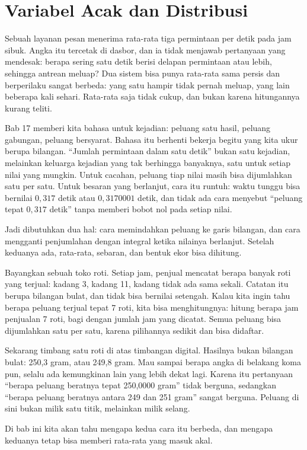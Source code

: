 \chapter{Variabel Acak dan Distribusi}

Sebuah layanan pesan menerima rata-rata tiga permintaan per detik pada jam sibuk.
Angka itu tercetak di dasbor, dan ia tidak menjawab pertanyaan yang mendesak: berapa
sering satu detik berisi delapan permintaan atau lebih, sehingga antrean meluap? Dua sistem bisa punya rata-rata sama persis dan berperilaku
sangat berbeda: yang satu hampir tidak pernah meluap, yang lain beberapa kali sehari.
Rata-rata saja tidak cukup, dan bukan karena hitungannya kurang teliti.

Bab 17 memberi kita bahasa untuk kejadian: peluang satu hasil, peluang gabungan,
peluang bersyarat. Bahasa itu berhenti bekerja begitu yang kita ukur berupa bilangan.
``Jumlah permintaan dalam satu detik'' bukan satu kejadian, melainkan keluarga
kejadian yang tak berhingga banyaknya, satu untuk setiap nilai yang mungkin. Untuk
cacahan, peluang tiap nilai masih bisa dijumlahkan satu per satu. Untuk besaran yang
berlanjut, cara itu runtuh: waktu tunggu bisa bernilai $0{,}317$ detik atau
$0{,}3170001$ detik, dan tidak ada cara menyebut ``peluang tepat $0{,}317$ detik''
tanpa memberi bobot nol pada setiap nilai.

Jadi dibutuhkan dua hal: cara memindahkan peluang ke garis bilangan, dan cara
mengganti penjumlahan dengan integral ketika nilainya berlanjut.
Setelah keduanya ada, rata-rata, sebaran, dan bentuk ekor bisa dihitung.

\begin{untukanak}
Bayangkan sebuah toko roti. Setiap jam, penjual mencatat berapa banyak roti yang
terjual: kadang 3, kadang 11, kadang tidak ada sama sekali. Catatan itu berupa
bilangan bulat, dan tidak bisa bernilai setengah. Kalau kita ingin tahu berapa peluang
terjual tepat 7 roti, kita bisa menghitungnya: hitung berapa jam penjualan 7 roti,
bagi dengan jumlah jam yang dicatat. Semua peluang bisa dijumlahkan satu per satu,
karena pilihannya sedikit dan bisa didaftar.

Sekarang timbang satu roti di atas timbangan digital. Hasilnya bukan bilangan bulat:
250,3 gram, atau 249,8 gram. Mau sampai berapa angka di belakang koma pun, selalu ada
kemungkinan lain yang lebih dekat lagi. Karena itu pertanyaan ``berapa peluang beratnya
tepat 250,0000 gram'' tidak berguna, sedangkan ``berapa peluang beratnya antara 249
dan 251 gram'' sangat berguna. Peluang di sini bukan milik satu titik, melainkan milik
selang.

Di bab ini kita akan tahu mengapa kedua cara itu berbeda, dan mengapa keduanya tetap
bisa memberi rata-rata yang masuk akal.
\end{untukanak}

